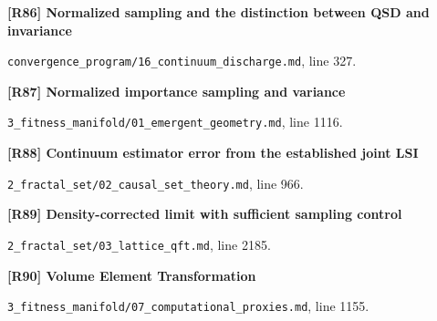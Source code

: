 \documentclass[11pt,a4paper]{article}
\begin{document}
\par\medskip\noindent\begin{minipage}{\linewidth}\textbf{[R86] Normalized sampling and the distinction between QSD and invariance}\label{src:lem-continuum-a3-qsd-sampling}\par
{\small\texttt{}\par
\nolinkurl{convergence_program/16_continuum_discharge.md}, line 327.\par}
\end{minipage}\par

\par\medskip\noindent\begin{minipage}{\linewidth}\textbf{[R87] Normalized importance sampling and variance}\label{src:prop-monte-carlo-riemannian-latent}\par
{\small\texttt{}\par
\nolinkurl{3_fitness_manifold/01_emergent_geometry.md}, line 1116.\par}
\end{minipage}\par

\par\medskip\noindent\begin{minipage}{\linewidth}\textbf{[R88] Continuum estimator error from the established joint LSI}\label{src:cor-cst-inherited-lsi-consistency}\par
{\small\texttt{}\par
\nolinkurl{2_fractal_set/02_causal_set_theory.md}, line 966.\par}
\end{minipage}\par

\par\medskip\noindent\begin{minipage}{\linewidth}\textbf{[R89] Density-corrected limit with sufficient sampling control}\label{src:prop-density-corrected-limit}\par
{\small\texttt{}\par
\nolinkurl{2_fractal_set/03_lattice_qft.md}, line 2185.\par}
\end{minipage}\par

\par\medskip\noindent\begin{minipage}{\linewidth}\textbf{[R90] Volume Element Transformation}\label{src:thm-volume-element-transformation}\par
{\small\texttt{}\par
\nolinkurl{3_fitness_manifold/07_computational_proxies.md}, line 1155.\par}
\end{minipage}\par
\end{document}
